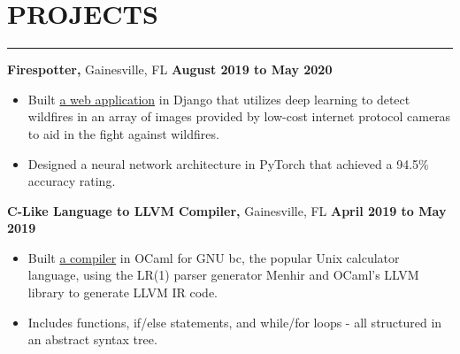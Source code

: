 \section*{PROJECTS}

\hrule \relax
\sectionheaderspace

\noindent\textbf{Firespotter,} Gainesville, FL  \hfill\textbf{August 2019 to May 2020}
\begin{itemize}[noitemsep,nolistsep, label={-}]
	\item Built \href{https://github.com/UF-CEN4914/firespotter}{a web application} in Django that utilizes deep learning to detect wildfires in an array of images provided by low-cost internet protocol cameras to aid in the fight against wildfires.
	\item Designed a neural network architecture in PyTorch that achieved a 94.5\% accuracy rating.
\end{itemize}
\subsectionspace

\noindent\textbf{C-Like Language to LLVM Compiler,} Gainesville, FL  \hfill\textbf{April 2019 to May 2019}
\begin{itemize}[noitemsep,nolistsep, label={-}]
	\item Built \href{https://github.com/hodsonus/programming-language-concepts}{a compiler} in OCaml for GNU bc, the popular Unix calculator language, using the LR(1) parser generator Menhir and OCaml's LLVM library to generate LLVM IR code.
	\item Includes functions, if/else statements, and while/for loops - all structured in an abstract syntax tree.
\end{itemize}
\subsectionspace